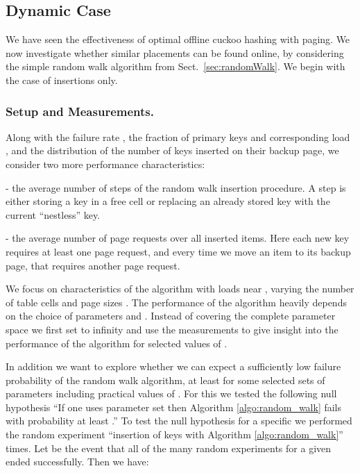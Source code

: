 \let\accentvec\vec \documentclass{llncs}
\begin{document}
\subsection{Dynamic Case}
We have seen the effectiveness of optimal offline cuckoo hashing with paging.
We now investigate whether similar placements can be found online, by considering the simple random walk algorithm
from Sect.~\ref{sec:randomWalk}.  We begin with the case of insertions only.

\subsubsection{Setup and Measurements.}
Along with the failure rate , 
the fraction of primary keys  and corresponding load , 
and the distribution of the number of keys  inserted on their backup page,
we consider two more performance characteristics:
\begin{compactitem}
\item[] - the average number of steps of the random walk insertion procedure. A step is either storing a key  in a free cell  or replacing an already stored key with the current ``nestless'' key.
\item[] - the average number of page requests over all inserted items. Here each new key  requires at least one page request, and every time we move an item to its backup page, that requires another page request. 
\end{compactitem}


We focus on characteristics of the algorithm with loads near , varying the number of table cells  and page sizes . The performance of the algorithm heavily depends on the choice of parameters  and . Instead of covering the complete parameter space we first set  to infinity and use the measurements to give insight into the performance of the algorithm for selected values of .

In addition we want to explore whether we can expect a sufficiently low failure probability of the random walk algorithm, at least for some selected sets of parameters  including practical values of . For this we tested the following null hypothesis 
``If one uses parameter set  then Algorithm \ref{algo:random_walk} fails with probability at least .''
To test the null hypothesis for a specific  we performed the random experiment ``insertion of  keys with Algorithm \ref{algo:random_walk}''  times.
Let  be the event that all of the  many random experiments for a given  ended successfully. Then we have:
\end{document}
